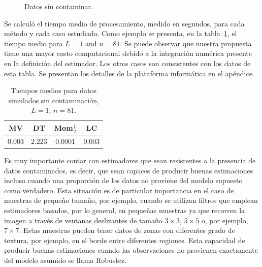 \begin{figure}[h!]
	\caption{\small Datos sin contaminar.}
\end{figure}

Se calculó el tiempo medio de procesamiento, medido en segundos, para cada método y cada caso estudiado. Como  ejemplo se presenta, en la tabla~\ref{tablaDeTiemposmedios}, el tiempo medio para $L=1$ and $n=81$. Se puede observar que nuestra propuesta tiene una mayor costo computacional debido a la integración numérica presente en la definición del estimador. Los otros casos son consistentes con los datos de esta tabla. 
Se presentan los detalles de la plataforma informática en el apéndice.

\begin{table}[htb]
	\centering
	\begin{tabular}{cccc}
		\toprule
		MV& DT& Mom$\frac{1}{2}$ & LC \\
		\midrule
		$0.003$& $2.223$ & $0.0001$ &$0.003$ \\
		\bottomrule
	\end{tabular}
\caption{\label{tablaDeTiemposmedios}\small Tiempos medios para datos simulados sin contaminación, $L=1$, $n=81$. }
\end{table}

Es muy importante contar con estimadores que sean resistentes a la presencia de datos contaminados, es decir, que sean capaces de producir buenas estimaciones incluso cuando una proporción de los datos no proviene del modelo supuesto como verdadero. Esta situación es de particular importancia en el caso de muestras de pequeño tamaño, por ejemplo, cuando se utilizan filtros que emplean estimadores basados, por lo general, en pequeñas muestras ya que recorren la imagen a través de ventanas deslizantes de tamaño $3 \times 3$, $5 \times 5$ o, por ejemplo, $7 \times 7$. Estas muestras pueden tener datos de zonas con diferentes grado de textura, por ejemplo, en el borde entre diferentes regiones. Esta capacidad de producir buenas estimaciones cuando las observaciones no provienen exactamente del modelo asumido se llama Robustez.

